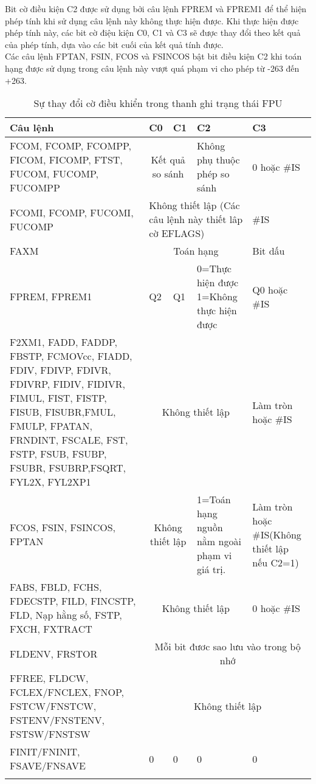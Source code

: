 	Bit cờ điều kiện C2 được sử dụng bởi câu lệnh FPREM và FPREM1 để thể hiện phép tính khi sử dụng câu lệnh này không thực hiện được. Khi thực hiện được phép tính này, các bit cờ điệu kiện C0, C1 và C3 sẽ được thay đổi theo kết quả của phép tính, dựa vào các bit cuối của kết quả tính được. \\

	Các câu lệnh FPTAN, FSIN, FCOS và FSINCOS bật bit điều kiện C2 khi toán hạng được sử dụng trong câu lệnh này vượt quá phạm vi cho phép từ -263 đến +263. 
		
		\newpage
		\begin{longtable}{ | m{5cm} | m{2cm} |  m{2cm} | m{2cm} | m{2cm}| }
			\hline
				Câu lệnh &  C0 & C1 & C2& C3\\
			\hline
			\hline
				FCOM, FCOMP, FCOMPP, FICOM, FICOMP, FTST, FUCOM, FUCOMP, FUCOMPP & \multicolumn{2}{c|}{Kết quả so sánh} & Không phụ thuộc phép so sánh & 0 hoặc \#IS \\
			\hline
				FCOMI, FCOMP, FUCOMI, FUCOMP	 & \multicolumn{3}{p{7cm}|}{Không thiết lập (Các câu lệnh này thiết lâp cờ EFLAGS) } & \#IS \\
				\hline 
				FAXM & \multicolumn{3}{c|}{Toán hạng} & Bit dấu\\
				\hline 
				FPREM, FPREM1 & Q2 & Q1 & 0=Thực hiện được 1=Không thực hiện được & Q0 hoặc \#IS \\
				\hline
				F2XM1, FADD, FADDP, 	FBSTP, FCMOVcc, FIADD, FDIV, FDIVP, FDIVR, FDIVRP, FIDIV, FIDIVR,	FIMUL, FIST, FISTP, FISUB, FISUBR,FMUL, FMULP, FPATAN, FRNDINT, FSCALE, FST, FSTP, FSUB, FSUBP, FSUBR, FSUBRP,FSQRT, FYL2X, FYL2XP1 & \multicolumn{3}{c|}{Không thiết lập} & Làm tròn hoặc \#IS \\
				\hline
				FCOS, FSIN, FSINCOS, FPTAN & \multicolumn{2}{c|}{Không thiết lập} & 1=Toán hạng nguồn nằm ngoài phạm vi giá trị. & Làm tròn hoặc \#IS(Không thiết lập nếu C2=1) \\
				\hline
				FABS, FBLD, FCHS, FDECSTP, FILD, FINCSTP, FLD, Nạp hằng số, FSTP, FXCH, FXTRACT & \multicolumn{3}{c|}{Không thiết lập} & 0 hoặc \#IS \\
				\hline
				FLDENV, FRSTOR & \multicolumn{4}{c|}{Mỗi bit đươc sao lưu vào trong bộ nhớ}\\
				\hline
				FFREE, FLDCW, FCLEX/FNCLEX, FNOP, FSTCW/FNSTCW, FSTENV/FNSTENV, FSTSW/FNSTSW & \multicolumn{4}{c|}{Không thiết lập}\\
				\hline
				FINIT/FNINIT, FSAVE/FNSAVE & 0 & 0 &0 & 0\\
			\hline
				\caption{Sự thay đổi cờ điều khiển trong thanh ghi trạng thái FPU}
				\label{tb:SuThayDoiCode}
		\end{longtable}	
			
